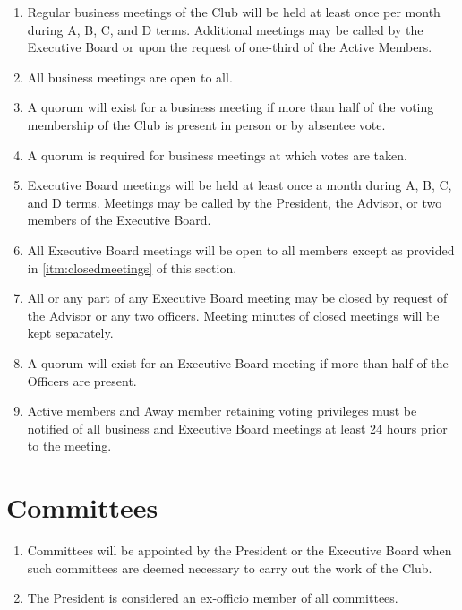 \documentclass[12pt,letterpaper,oneside]{book}
\begin{document}
\begin{enumerate}

\item Regular business meetings of the Club will be held at least once per month during A, B, C, and D terms. Additional meetings may be called by the Executive Board or upon the request of one-third of the Active Members.
\item All business meetings are open to all.
\item A quorum will exist for a business meeting if more than half of the voting membership of the Club is present in person or by absentee vote.
\item A quorum is required for business meetings at which votes are taken.
\item Executive Board meetings will be held at least once a month during A, B, C, and D terms. Meetings may be called by the President, the Advisor, or two members of the Executive Board.
\item All Executive Board meetings will be open to all members except as provided in \cref{itm:closedmeetings} of this section.
\item \label{itm:closedmeetings} All or any part of any Executive Board meeting may be closed by request of the Advisor or any two officers. Meeting minutes of closed meetings will be kept separately.
\item A quorum will exist for an Executive Board meeting if more than half of the Officers are present.
\item Active members and Away member retaining voting privileges must be notified of all business and Executive Board meetings at least 24 hours prior to the meeting.

\end{enumerate}

\chapter{Committees}

\begin{enumerate}

\item Committees will be appointed by the President or the Executive Board when such committees are deemed necessary to carry out the work of the Club.
\item The President is considered an ex-officio member of all committees.

\end{enumerate}
\end{document}
